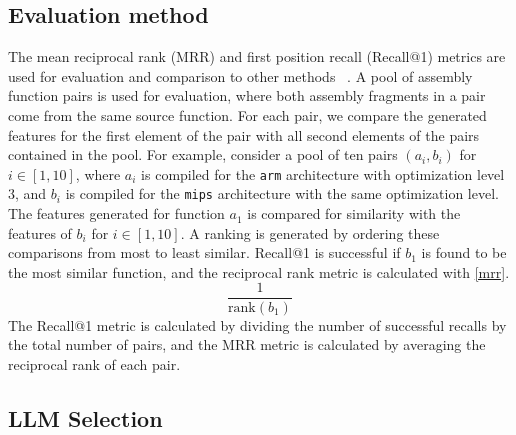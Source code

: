 \subsection{Evaluation method}

The mean reciprocal rank (MRR) and first position recall (Recall@1) metrics are used for evaluation and comparison to other methods
~\cite{deprio,code-not-lang,Asm2Vec,CLAP,SAFE}.
A pool of assembly function pairs is used for evaluation, where both assembly fragments in a pair come from the same source function.
For each pair, we compare the generated features for the first element of the pair with all second elements of the pairs contained
in the pool.  For example, consider a pool of ten pairs \((a_i, b_i)\) for \(i \in [1, 10]\), where \(a_i\) is compiled for the \texttt{arm}
architecture with optimization level \(3\), and \(b_i\) is compiled for the \texttt{mips} architecture with the same optimization
level. The features generated for function \(a_1\) is compared for similarity with the features of \(b_i\) for \(i \in [1, 10]\).
A ranking is generated by ordering these comparisons from most to least similar. Recall@1 is successful
if \(b_1\) is found to be the most similar function, and the reciprocal rank metric is calculated with \ref{mrr}.
\begin{equation} \label{mrr}
\frac{1}{\text{rank}(b_1)}
\end{equation}
\noindent The Recall@1 metric is calculated by dividing the number of successful recalls by the total number of pairs, and the
MRR metric is calculated by averaging the reciprocal rank of each pair.

\subsection{LLM Selection}

